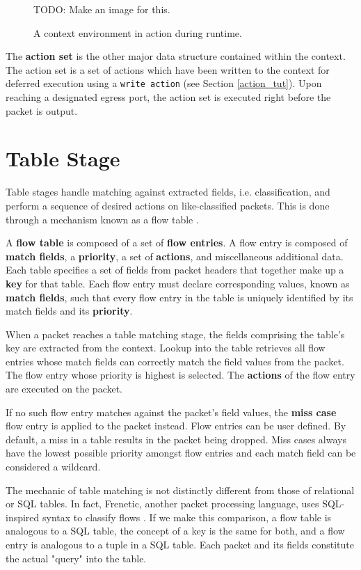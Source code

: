 \begin{figure}
TODO: Make an image for this.
\caption{A context environment in action during runtime.}
\label{fg:ContextEnvWorking}
\end{figure}

The \textbf{action set} is the other major data structure contained within the context. The action set is a set of actions which have been written to the context for deferred execution using a \texttt{write action} (see Section \ref{action_tut}). Upon reaching a designated egress port, the action set is executed right before the packet is output.

\section{Table Stage} \label{table_desc}

Table stages handle matching against extracted fields, i.e. classification, and perform a sequence of desired actions on like-classified packets. This is done through a mechanism known as a flow table \cite{openflow_spec}.

A \textbf{flow table} is composed of a set of \textbf{flow entries}. A flow entry is composed of \textbf{match fields}, a \textbf{priority}, a set of \textbf{actions}, and miscellaneous additional data. Each table specifies a set of fields from packet headers that together make up a \textbf{key} for that table. Each flow entry must declare corresponding values, known as \textbf{match fields}, such that every flow entry in the table is uniquely identified by its match fields and its \textbf{priority}.

When a packet reaches a table matching stage, the fields comprising the table's key are extracted from the context. Lookup into the table retrieves all flow entries whose match fields can correctly match the field values from the packet. The flow entry whose priority is highest is selected. The \textbf{actions} of the flow entry are executed on the packet.

If no such flow entry matches against the packet's field values, the \textbf{miss case} flow entry is applied to the packet instead. Flow entries can be user defined. By default, a miss in a table results in the packet being dropped. Miss cases always have the lowest possible priority amongst flow entries and each match field can be considered a wildcard.

The mechanic of table matching is not distinctly different from those of relational or SQL tables. In fact, Frenetic, another packet processing language, uses SQL-inspired syntax to classify flows \cite{frenetic_paper1}. If we make this comparison, a flow table is analogous to a SQL table, the concept of a key is the same for both, and a flow entry is analogous to a tuple in a SQL table. Each packet and its fields constitute the actual "query" into the table.

